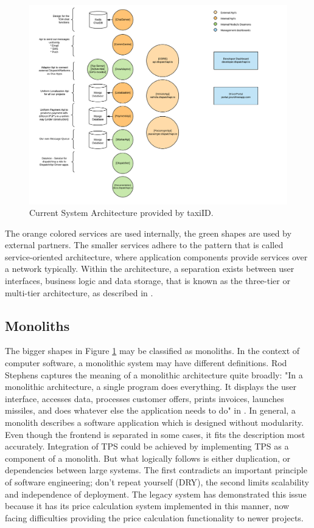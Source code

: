 \begin{figure}[H]
	\centering
	\includegraphics[width=1\textwidth]{Architecture}
	\caption[Current System Architecture]{Current System Architecture provided by taxiID.}
	\label{fig:Architecture}
\end{figure}

The orange colored services are used internally, the green shapes are used by external partners. The smaller services adhere to the pattern that is called service-oriented architecture, where application components provide services over a network typically. Within the architecture, a separation exists between user interfaces, business logic and data storage, that is known as the three-tier or multi-tier architecture, as described in \cite{IBM-3-tier}.

\subsection{Monoliths}
The bigger shapes in Figure \ref{fig:Architecture} may be classified as monoliths. In the context of computer software, a monolithic system may have different definitions. Rod Stephens captures the meaning of a monolithic architecture quite broadly: "In a monolithic architecture, a single program does everything. It displays the user interface, accesses data, processes customer offers, prints invoices, launches missiles, and does whatever else the application needs to do" in \cite{rod-BSE}. In general, a monolith describes a software application which is designed without modularity. Even though the frontend is separated in some cases, it fits the description most accurately. Integration of TPS could be achieved by implementing TPS as a component of a monolith. But what logically follows is either duplication, or dependencies between large systems. The first contradicts an important principle of software engineering; don't repeat yourself (DRY), the second limits scalability and independence of deployment. The legacy system has demonstrated this issue because it has its price calculation system implemented in this manner, now facing difficulties providing the price calculation functionality to newer projects.

